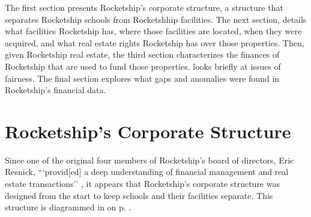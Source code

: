 The first section presents Rocketship's corporate structure, a structure that separates Rocketship schools from Rocketshhip facilities. The next section,  details what facilities Rocketship has, where those facilities are located, when they were acquired, and what real estate rights Rocketship has over those properties. Then, given Rocketship real estate, the third section characterizes the finances of Rocketship that are used to fund those properties.  looks briefly at issues of fairness. The final section explores what gaps and anomalies were found in Rocketship's financial data.

\section{Rocketship's Corporate Structure}\indent%
\label{sec:RSED-corporate-structure}

Since one of the original four members of Rocketship's board of directors, Eric Resnick, ```provid[ed] a deep
understanding of financial management and real estate transactions'' \parencite{Danner2006}%
, it appears that Rocketship's corporate structure was designed from the start to keep schools and their facilities separate. This structure is diagrammed in  on p. \pageref{fig:corporate-structure}.

